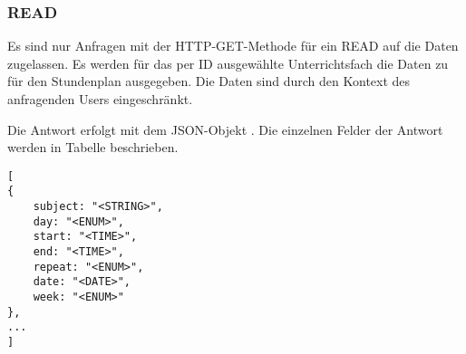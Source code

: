 \subsubsection{READ}
\label{secrest:api:subjects:id:timetable:read}
Es sind nur Anfragen mit der HTTP-GET-Methode für ein READ auf die Daten zugelassen.
Es werden für das per ID ausgewählte Unterrichtsfach die Daten zu für den Stundenplan ausgegeben.
Die Daten sind durch den Kontext des anfragenden Users eingeschränkt.

Die Antwort erfolgt mit dem JSON-Objekt . 
Die einzelnen Felder der Antwort werden in Tabelle  beschrieben.

\begin{lstlisting}[caption={JSON-Antwort für einen GET-Aufruf des Pfads /api/subjects/\$id/timetable},label={lst:code:rest:api:subjects:id:timetable:read:ret},frame=tlrb]
[
{
	subject: "<STRING>",
	day: "<ENUM>",
	start: "<TIME>",
	end: "<TIME>",
	repeat: "<ENUM>",
	date: "<DATE>",
	week: "<ENUM>"
},
...
]
\end{lstlisting}
